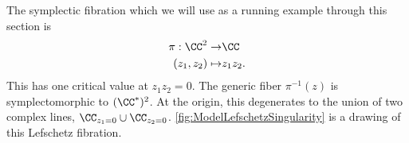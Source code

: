 

    The symplectic fibration which we will use as a running example through this section is 
    \begin{align*}
        \pi:\CC^2\to& \CC\\
        (z_1, z_2)\mapsto& z_1z_2.
    \end{align*}
    This has one critical value at $z_1z_2=0$.
    The generic fiber $\pi^{-1}(z)$ is symplectomorphic to $(\CC^*)^2$.
    At the origin, this degenerates to the union of two complex lines, $\CC_{z_1=0}\cup \CC_{z_2=0}$.
    \cref{fig:ModelLefschetzSingularity} is a drawing of this Lefschetz fibration.

